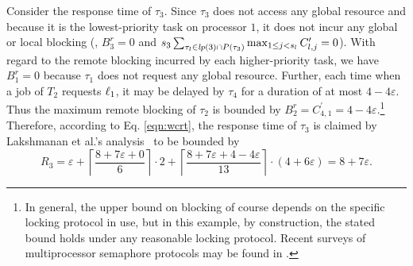 Consider the response time of $\tau_3$. Since $\tau_3$ does not access any global resource and because it is the lowest-priority task on processor $1$, it does not incur any global or local blocking (\ie, $B_3^r = 0$ and $s_3 \sum_{\tau_l \in \mathit{lp}(3) \cap P(\tau_3)} \max_{1 \leq j < s_l} C_{l,j}^{\prime} = 0$). With regard to the remote blocking incurred by each higher-priority task, we have $B_1^r = 0$ because $\tau_1$ does not request any global resource. Further, each time when a job of $T_2$ requests $\ell_1$, it may be delayed by $\tau_4$ for a duration of at most $4-4\varepsilon$. Thus the maximum remote blocking of $\tau_2$ is bounded by $B_2^r = C_{4,1}^{\prime} = 4-4\varepsilon$.\footnote{In general, the upper bound on blocking of course depends on the specific locking protocol in use, but in this example, by construction, the stated bound holds under any reasonable locking protocol. Recent surveys of multiprocessor semaphore protocols may be found in \cite{bbb-2013,yang-2015}.} Therefore, according to Eq. \eqref{eqn:wcrt}, the response time of $\tau_3$ is claimed by  Lakshmanan et al.'s analysis~\cite{lakshmanan-2009} to be bounded by
\begin{equation*}
R_3 = \varepsilon + \left \lceil \frac{8+7\varepsilon + 0}{6} \right \rceil \cdot 2 + \left \lceil \frac{8+7\varepsilon + 4-4\varepsilon}{13} \right \rceil \cdot (4+6\varepsilon) = 8+7\varepsilon.
\end{equation*}


